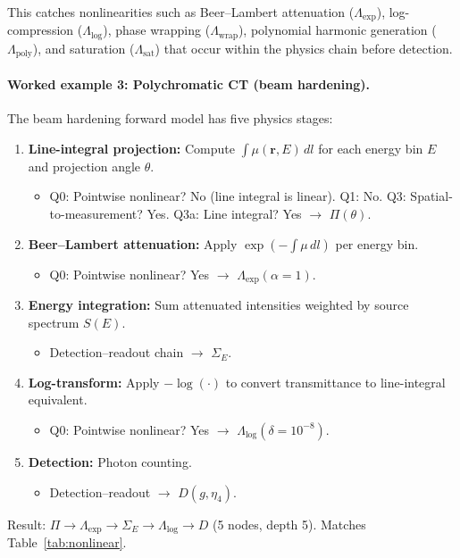 \medskip
\noindent This catches nonlinearities such as Beer--Lambert attenuation ($\Lambda_{\exp}$), log-compression ($\Lambda_{\log}$), phase wrapping ($\Lambda_{\mathrm{wrap}}$), polynomial harmonic generation ($\Lambda_{\mathrm{poly}}$), and saturation ($\Lambda_{\mathrm{sat}}$) that occur within the physics chain before detection.

\paragraph{Worked example 3: Polychromatic CT (beam hardening).}
The beam hardening forward model has five physics stages:
\begin{enumerate}
  \item \textbf{Line-integral projection:} Compute $\int \mu(\mathbf{r}, E)\, dl$ for each energy bin $E$ and projection angle $\theta$.
  \begin{itemize}
    \item Q0: Pointwise nonlinear? No (line integral is linear). Q1: No. Q3: Spatial-to-measurement? Yes. Q3a: Line integral? Yes $\to$ $\Pi(\theta)$.
  \end{itemize}
  \item \textbf{Beer--Lambert attenuation:} Apply $\exp(-\int \mu\, dl)$ per energy bin.
  \begin{itemize}
    \item Q0: Pointwise nonlinear? Yes $\to$ $\Lambda_{\exp}(\alpha = 1)$.
  \end{itemize}
  \item \textbf{Energy integration:} Sum attenuated intensities weighted by source spectrum $S(E)$.
  \begin{itemize}
    \item Detection--readout chain $\to$ $\Sigma_E$.
  \end{itemize}
  \item \textbf{Log-transform:} Apply $-\log(\cdot)$ to convert transmittance to line-integral equivalent.
  \begin{itemize}
    \item Q0: Pointwise nonlinear? Yes $\to$ $\Lambda_{\log}(\delta = 10^{-8})$.
  \end{itemize}
  \item \textbf{Detection:} Photon counting.
  \begin{itemize}
    \item Detection--readout $\to$ $D(g, \eta_4)$.
  \end{itemize}
\end{enumerate}
Result: $\Pi \to \Lambda_{\exp} \to \Sigma_E \to \Lambda_{\log} \to D$ (5 nodes, depth 5). Matches Table~\ref{tab:nonlinear}.


